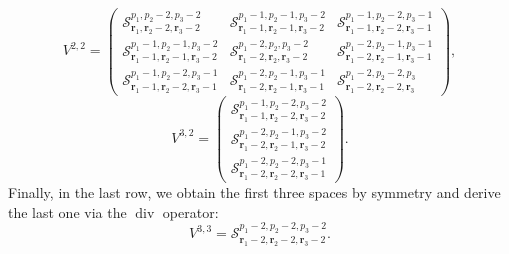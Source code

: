 \documentclass[final]{amsart}%
\newcommand{\0}{\mathaccent23}
\renewcommand\div{\operatorname{div}}
\newcommand{\br}{\mathbf r}
\begin{document}
$$V^{2, 2}=
\begin{pmatrix}
\mathcal S^{p_{1}, p_{2}-2, p_{3}-2}_{  \br_{1},  \br_{2}-2,  \br_{3}-2} &\mathcal S^{p_{1}-1, p_{2}-1, p_{3}-2}_{  \br_{1}-1,  \br_{2}-1,  \br_{3}-2}&\mathcal S^{p_{1}-1, p_{2}-2, p_{3}-1}_{  \br_{1}-1,  \br_{2}-2,  \br_{3}-1} \\
\mathcal S^{p_{1}-1,p_{2}-1,p_{3}-2}_{  \br_{1}-1, \br_{2}-1, \br_{3}-2}&\mathcal S^{p_{1}-2, p_{2}, p_{3}-2}_{  \br_{1}-2,  \br_{2},  \br_{3}-2}&
\mathcal S^{p_{1}-2, p_{2}-1, p_{3}-1}_{  \br_{1}-2,  \br_{2}-1,  \br_{3}-1}\\
\mathcal S^{p_{1}-1, p_{2}-2, p_{3}-1}_{  \br_{1}-1,  \br_{2}-2,  \br_{3}-1} & \mathcal S^{p_{1}-2, p_{2}-1, p_{3}-1}_{  \br_{1}-2,  \br_{2}-1,  \br_{3}-1}& \mathcal S^{p_{1}-2, p_{2}-2, p_{3}}_{  \br_{1}-2,  \br_{2}-2,  \br_{3}}
\end{pmatrix},
$$
$$
V^{3, 2}=
\begin{pmatrix}
\mathcal S^{p_{1}-1, p_{2}-2, p_{3}-2}_{  \br_{1}-1,  \br_{2}-2,  \br_{3}-2}\\
\mathcal S^{p_{1}-2, p_{2}-1, p_{3}-2}_{  \br_{1}-2,  \br_{2}-1,  \br_{3}-2}\\
\mathcal S^{p_{1}-2, p_{2}-2, p_{3}-1}_{  \br_{1}-2,  \br_{2}-2, \br_{3}-1}
\end{pmatrix}.
$$
Finally, in the last row, we obtain the first three spaces by symmetry and derive the last one via the $\div$ operator:
$$ 
V^{3, 3}=\mathcal S^{p_{1}-2, p_{2}-2, p_{3}-2}_{  \br_{1}-2,  \br_{2}-2,  \br_{3}-2}.$$
\end{document}
